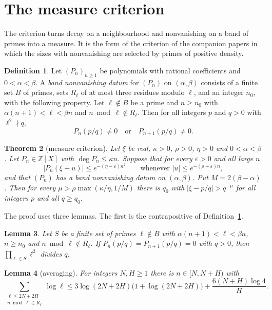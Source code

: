 \documentclass[11pt]{amsart}
\newtheorem{theorem}{Theorem}[section]
\newtheorem{lemma}[theorem]{Lemma}
\theoremstyle{definition}
\newtheorem{definition}[theorem]{Definition}
\theoremstyle{remark}
\numberwithin{equation}{section}
\newcommand{\Z}{\mathbb Z}
\begin{document}
\section{The measure criterion}\label{sec:criterion}

The criterion turns decay on a neighbourhood and nonvanishing on a band of primes into a measure. It is the form of
the criterion of the companion papers \cite{Litsey2026d} in which the sizes with nonvanishing are selected by primes of
positive density.

\begin{definition}\label{def:band}
Let $(P_n)_{n\ge1}$ be polynomials with rational coefficients and $0<\alpha<\beta$. A \emph{band nonvanishing datum} for
$(P_n)$ on $(\alpha,\beta)$ consists of a finite set $B$ of primes, sets $R_\ell$ of at most three residues modulo
$\ell$, and an integer $n_0$, with the following property. Let $\ell\notin B$ be a prime and $n\ge n_0$ with
$\alpha(n+1)<\ell<\beta n$ and $n\bmod\ell\notin R_\ell$. Then for all integers $p$ and $q>0$ with $\ell^2\nmid q$,
\[
 P_n(p/q)\ne0\quad\text{or}\quad P_{n+1}(p/q)\ne0 .
\]
\end{definition}

\begin{theorem}[measure criterion]\label{thm:criterion}
Let $\xi$ be real, $\kappa>0$, $\rho>0$, $\eta>0$ and $0<\alpha<\beta$. Let $P_n\in\Z[X]$ with $\deg P_n\le\kappa n$.
Suppose that for every $\varepsilon>0$ and all large $n$
\[
 |P_n(\xi+u)|\le e^{-(\eta-\varepsilon)n^2}\qquad\text{whenever } |u|\le e^{-(\rho+\varepsilon)n},
\]
and that $(P_n)$ has a band nonvanishing datum on $(\alpha,\beta)$. Put $M=2(\beta-\alpha)$. Then for every
$\mu>\rho\max(\kappa/\eta,1/M)$ there is $q_0$ with $|\xi-p/q|>q^{-\mu}$ for all integers $p$ and all $q\ge q_0$.
\end{theorem}

The proof uses three lemmas. The first is the contrapositive of Definition~\ref{def:band}.

\begin{lemma}\label{lem:pairdiv}
Let $S$ be a finite set of primes $\ell\notin B$ with $\alpha(n+1)<\ell<\beta n$, $n\ge n_0$ and $n\bmod\ell\notin R_\ell$.
If $P_n(p/q)=P_{n+1}(p/q)=0$ with $q>0$, then $\prod_{\ell\in S}\ell^2$ divides $q$.
\end{lemma}

\begin{lemma}[averaging]\label{lem:average}
For integers $N,H\ge1$ there is $n\in[N,N+H)$ with
\[
 \sum_{\substack{\ell\le2N+2H\\ n\bmod\ell\in R_\ell}}\log\ell\le3\log(2N+2H)\bigl(1+\log(2N+2H)\bigr)+\frac{6(N+H)\log4}H .
\]
\end{lemma}
\end{document}

